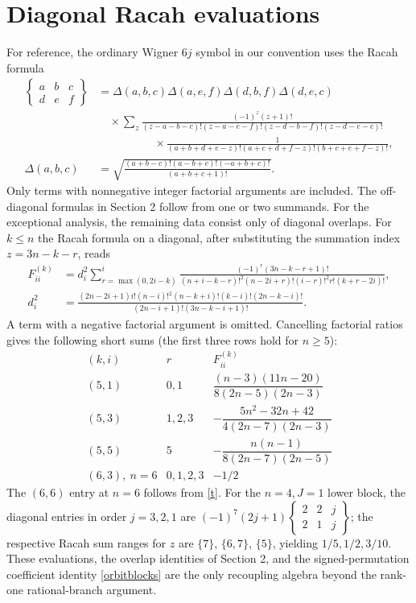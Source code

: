 \documentclass[11pt]{article}
\begin{document}
\section{Diagonal Racah evaluations}\label{app}
For reference, the ordinary Wigner $6j$ symbol in our convention uses the Racah formula
\begin{align*}
 \begin{Bmatrix}a&b&c\\d&e&f\end{Bmatrix}
 &=\Delta(a,b,c)\Delta(a,e,f)\Delta(d,b,f)\Delta(d,e,c)\\
 &\quad\times\sum_z\frac{(-1)^z(z+1)!}{
 (z-a-b-c)!(z-a-e-f)!(z-d-b-f)!(z-d-e-c)!}\\[-1pt]
 &\hspace{5em}\times\frac{1}{(a+b+d+e-z)!(a+c+d+f-z)!(b+c+e+f-z)!},\\
 \Delta(a,b,c)&=\sqrt{\frac{(a+b-c)!(a-b+c)!(-a+b+c)!}{(a+b+c+1)!}}.
\end{align*}
Only terms with nonnegative integer factorial arguments are included. The off-diagonal formulas in Section 2 follow from one or two summands. For the exceptional analysis, the remaining data consist only of diagonal overlaps. For $k\le n$ the Racah formula on a diagonal, after substituting the summation index $z=3n-k-r$, reads
\begin{align*}
F^{(k)}_{ii}&=d_i^2\sum_{r=\max(0,2i-k)}^i
\frac{(-1)^r(3n-k-r+1)!}{(n+i-k-r)!^2(n-2i+r)!(i-r)!^2r!(k+r-2i)!},\\
d_i^2&=\frac{(2n-2i+1)i!(n-i)!^2(n-k+i)!(k-i)!(2n-k-i)!}
{(2n-i+1)!(3n-k-i+1)!}.
\end{align*}
A term with a negative factorial argument is omitted. Cancelling factorial ratios gives the following short sums (the first three rows hold for $n\ge5$):
\[
\begin{array}{c|c|c}
(k,i)&r&F^{(k)}_{ii}\\ \hline
(5,1)&0,1&\dfrac{(n-3)(11n-20)}{8(2n-5)(2n-3)}\\[4pt]
(5,3)&1,2,3&-\dfrac{5n^2-32n+42}{4(2n-7)(2n-3)}\\[4pt]
(5,5)&5&-\dfrac{n(n-1)}{8(2n-7)(2n-5)}\\[4pt]
(6,3),\ n=6&0,1,2,3&-1/2
\end{array}
\]
The $(6,6)$ entry at $n=6$ follows from \eqref{t}. For the $n=4,J=1$ lower block, the diagonal entries in order $j=3,2,1$ are $(-1)^7(2j+1)\left\{\begin{smallmatrix}2&2&j\\2&1&j\end{smallmatrix}\right\}$; the respective Racah sum ranges for $z$ are $\{7\}$, $\{6,7\}$, $\{5\}$, yielding $1/5,1/2,3/10$. These evaluations, the overlap identities of Section 2, and the signed-permutation coefficient identity \eqref{orbitblocks} are the only recoupling algebra beyond the rank-one rational-branch argument.
\end{document}
